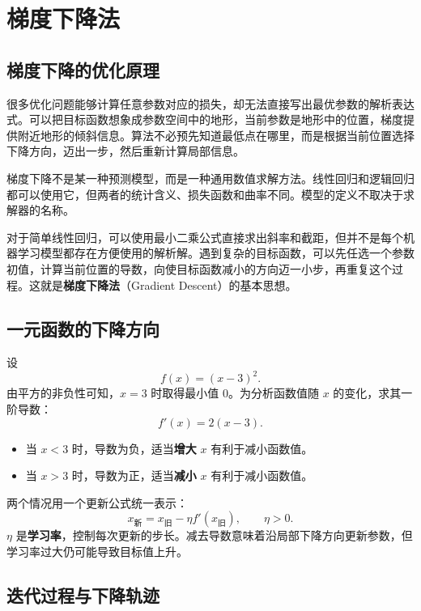 \section{梯度下降法}\label{ch:gradient}

\subsection{梯度下降的优化原理}

很多优化问题能够计算任意参数对应的损失，却无法直接写出最优参数的解析表达式。可以把目标函数想象成参数空间中的地形，当前参数是地形中的位置，梯度提供附近地形的倾斜信息。算法不必预先知道最低点在哪里，而是根据当前位置选择下降方向，迈出一步，然后重新计算局部信息。

梯度下降不是某一种预测模型，而是一种通用数值求解方法。线性回归和逻辑回归都可以使用它，但两者的统计含义、损失函数和曲率不同。模型的定义不取决于求解器的名称。

对于简单线性回归，可以使用最小二乘公式直接求出斜率和截距，但并不是每个机器学习模型都存在方便使用的解析解。遇到复杂的目标函数，可以先任选一个参数初值，计算当前位置的导数，向使目标函数减小的方向迈一小步，再重复这个过程。这就是\textbf{梯度下降法}（Gradient Descent）的基本思想。

\subsection{一元函数的下降方向}

设
\begin{equation}\label{eq:scalar-quadratic}
f(x)=(x-3)^2.
\end{equation}
由平方的非负性可知，$x=3$ 时取得最小值 $0$。为分析函数值随 $x$ 的变化，求其一阶导数：
\[
f'(x)=2(x-3).
\]
\begin{itemize}
\item 当 $x<3$ 时，导数为负，适当\textbf{增大} $x$ 有利于减小函数值。
\item 当 $x>3$ 时，导数为正，适当\textbf{减小} $x$ 有利于减小函数值。
\end{itemize}
两个情况用一个更新公式统一表示：
\begin{equation}\label{eq:scalar-update}
\boxed{x_{\text{新}}=x_{\text{旧}}-\eta f'(x_{\text{旧}}),\qquad \eta>0.}
\end{equation}
$\eta$ 是\textbf{学习率}，控制每次更新的步长。减去导数意味着沿局部下降方向更新参数，但学习率过大仍可能导致目标值上升。

\subsection{迭代过程与下降轨迹}

